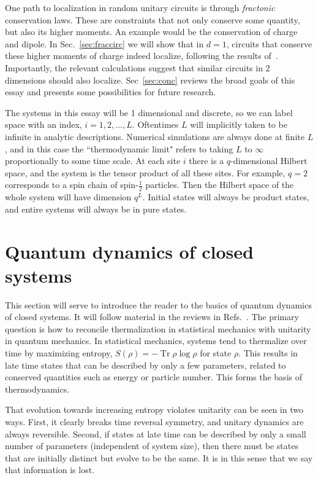\documentclass[a4paper,11pt]{article}
\newcommand{\half}{\frac{1}{2}}
\DeclareMathOperator{\Tr}{Tr}
\begin{document}
One path to localization in random unitary circuits is through \emph{fractonic} conservation laws. These are constraints that not only conserve some quantity, but also its higher moments. An example would be the conservation of charge and dipole. In Sec.~\ref{sec:fraccirc} we will show that in $d=1$, circuits that conserve these higher moments of charge indeed localize, following the results of~\cite{PaiFracton}. Importantly, the relevant calculations suggest that similar circuits in 2 dimensions should also localize.
Sec~\ref{sec:conc} reviews the broad goals of this essay and presents some possibilities for future research.

The systems in this essay will be 1 dimensional and discrete, so we can label space with an index, $i = 1,2,\dots,L$. Oftentimes $L$ will implicitly taken to be infinite in analytic descriptions. Numerical simulations are always done at finite $L$, and in this case the ``thermodynamic limit" refers to taking $L$ to $\infty$ proportionally to some time scale. At each site $i$ there is a $q$-dimensional Hilbert space, and the system is the tensor product of all these sites. For example, $q=2$ corresponds to a spin chain of spin-$\half$ particles. Then the Hilbert space of the whole system will have dimension $q^L$. Initial states will always be product states, and entire systems will always be in pure states.


\section{Quantum dynamics of closed systems} \label{sec:dyn}

This section will serve to introduce the reader to the basics of quantum dynamics of closed systems. It will follow material in the reviews in Refs.~\cite{Cazalilla2010, PolkovnikovClosed, Nandkishore14, GogolinStatMech}. The primary question is how to reconcile thermalization in statistical mechanics with unitarity in quantum mechanics. In statistical mechanics, systems tend to thermalize over time by maximizing entropy, $S(\rho)=-\Tr\rho\log\rho$ for state $\rho$. This results in late time states that can be described by only a few parameters, related to conserved quantities such as energy or particle number. This forms the basis of thermodynamics. 

That evolution towards increasing entropy violates unitarity can be seen in two ways. First, it clearly breaks time reversal symmetry, and unitary dynamics are always reversible. Second, if states at late time can be described by only a small number of parameters (independent of system size), then there must be states that are initially distinct but evolve to be the same. It is in this sense that we say that information is lost.
\end{document}
